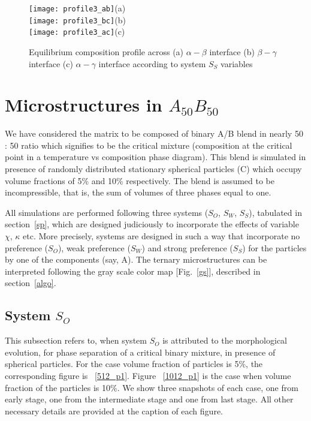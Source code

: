\documentclass[12pt]{iiscthes}
\theoremstyle{definition}
\theoremstyle{definition}
\theoremstyle{remark}
\begin{document}
\begin{figure}[H]
\begin{center}
\texttt{[image: profile3\_ab]}(a)\\
\texttt{[image: profile3\_bc]}(b)\\
\texttt{[image: profile3\_ac]}(c)\\
\caption{Equilibrium composition profile across (a) $\alpha - \beta$ interface (b) $\beta - \gamma$ interface (c) $\alpha - \gamma$ interface according to system $S_S$ variables}\label{iep3}
\end{center}
\end{figure}

\section{Microstructures in $A_{50}B_{50}$}\label{cmic}
We have considered the matrix to be composed of binary A/B blend in nearly 50 : 50 ratio which signifies to be the critical mixture (composition at the critical point in a temperature vs composition phase diagram). This blend is simulated in presence of randomly distributed stationary spherical particles (C) which occupy volume fractions of 5\% and 10\% respectively. The blend is assumed to be incompressible, that is, the sum of volumes of three phases equal to one. 

All simulations are performed following three systems ($S_O$, $S_W$, $S_S$), tabulated in section~\ref{sp}, which are designed judiciously to incorporate the effects of variable $\chi$, $\kappa$ etc. More precisely, systems are designed in such a way that incorporate no preference ($S_O$), weak preference ($S_W$) and strong preference ($S_S$) for the particles by one of the components (say, A). The ternary microstructures can be interpreted following the gray scale color map [Fig.~\ref{gs}], described in section~\ref{algo}.

\subsection{System $S_O$}
 This subsection refers to, when system $S_O$ is attributed to the morphological evolution, for phase separation of a critical binary mixture, in presence of spherical particles. For the case volume fraction of particles is 5\%, the corresponding figure is ~\ref{512_p1}. Figure ~\ref{1012_p1} is the case when volume fraction of the particles is 10\%.  We show three snapshots of each case, one from early stage, one from the intermediate stage and one from last stage. All other necessary details are provided at the caption of each figure. 
\end{document}
